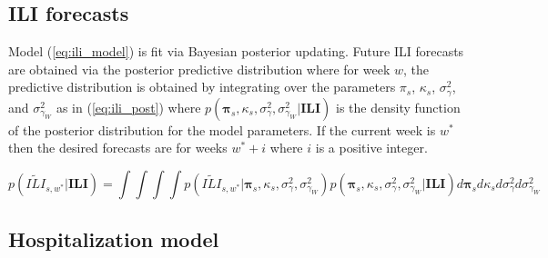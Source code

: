\documentclass[ba]{imsart}
\theoremstyle{plain}
\theoremstyle{definition}
\theoremstyle{remark}
\begin{document}
\subsection{ILI forecasts}
Model (\ref{eq:ili_model}) is fit via Bayesian posterior updating. Future ILI forecasts are obtained via the posterior predictive distribution where for week $w$, the predictive distribution is obtained by integrating over the parameters $\pi_s$, $\kappa_s$, $\sigma^2_{\gamma}$, and $\sigma^2_{\gamma_W}$ as in (\ref{eq:ili_post}) where $p(\boldsymbol{\pi}_s, \kappa_s, \sigma^2_{\gamma}, \sigma^2_{\gamma_W} | \textbf{ILI})$ is the density function of the posterior distribution for the model parameters. If the current week is $w^*$ then the desired forecasts are for weeks $w^* + i$ where $i$ is a positive integer.

\begin{equation}
    \label{eq:ili_post}
    p(\widetilde{ILI}_{s,w^*} | \textbf{ILI}) = \int \int \int \int p(\widetilde{ILI}_{s,w^*} | \boldsymbol{\pi}_s, \kappa_s, \sigma^2_{\gamma}, \sigma^2_{\gamma_W}) p(\boldsymbol{\pi}_s, \kappa_s, \sigma^2_{\gamma}, \sigma^2_{\gamma_W} | \textbf{ILI}) d\boldsymbol{\pi}_s d \kappa_s d \sigma^2_{\gamma} d \sigma^2_{\gamma_W}
\end{equation}





\subsection{Hospitalization model} \label{sec:hospital_model}
\end{document}
